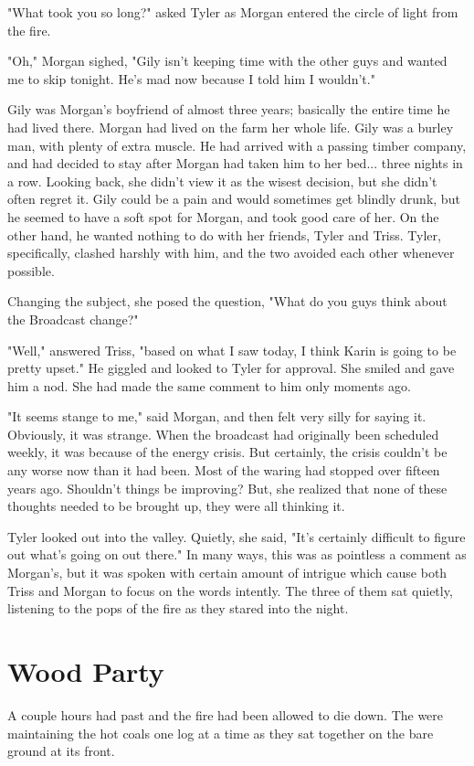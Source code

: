 \documentclass[courier]{sffms}
\begin{document}
"What took you so long?" asked Tyler as Morgan
entered the circle of light from the fire.

"Oh," Morgan sighed, "Gily isn't keeping time
with the other guys and wanted me to skip
tonight. He's mad now because I told him I
wouldn't."

Gily was Morgan's boyfriend of almost three years;
basically the entire time he had lived there.
Morgan had lived on the farm her whole life.
Gily was a burley man, with plenty of extra muscle.
He had arrived with a passing timber company,
and had decided to stay after Morgan had
taken him to her bed... three nights in a row.
Looking back, she
didn't view it as the wisest decision, but she didn't
often regret it. Gily could be a pain and would
sometimes get blindly drunk, but he seemed to
have a soft spot for Morgan, and took good care
of her. On the other hand, he wanted nothing to do
with her friends, Tyler and Triss. Tyler, specifically,
clashed harshly with him, and the two avoided
each other whenever possible.

Changing the subject, she posed the question,
"What do you guys think about the Broadcast
change?"

"Well," answered Triss, "based on what I saw
today, I think Karin is going to be pretty upset."
He giggled and looked to Tyler for approval.
She smiled and gave him a nod. She had made
the same comment to him only moments
ago.

"It seems stange to me," said Morgan, and
then felt very silly for saying it.
Obviously, it was strange. When the broadcast
had originally been scheduled weekly, it was
because of the energy crisis. But certainly,
the crisis couldn't be any worse now than it
had been. Most of the waring had stopped
over fifteen years ago. Shouldn't things be
improving? But, she realized that none 
of these thoughts needed
to be brought up, they were all thinking it.

Tyler looked out into the valley. Quietly,
she said, "It's certainly difficult to figure out what's
going on out there." In many ways, this was as
pointless a comment as Morgan's, but it was
spoken with certain amount of intrigue which
cause both Triss and Morgan to focus on
the words intently. The three of them sat quietly,
listening to the pops of the fire as they stared
into the night.

\chapter{Wood Party}
A couple hours had past and the fire had been
allowed to die down. The were maintaining the
hot coals one log at a time as they sat
together on the bare ground at its front.
\end{document}
